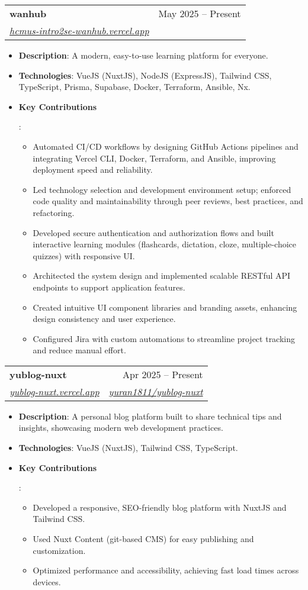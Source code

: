 \documentclass[letterpaper,11pt]{article}
\makeatletter
\newcommand{\resumeSubheading}[4]{\vspace{-1pt}\item
    \begin{tabular*}{0.97\textwidth}[t]{l@{\extracolsep{\fill}}r}
      \textbf{#1} & #2 \\
      \textit{\small#3} & \textit{\small #4} \\
    \end{tabular*}\vspace{-5pt}
}
\newcommand{\resumeItem}[2]{\item\small{\textbf{#1}{: #2\vspace{-2pt}}}}
\newcommand{\resumeItemListStart}{\begin{itemize}[leftmargin=*]}
\newcommand{\resumeItemListEnd}{\end{itemize}\vspace{-5pt}}
\makeatother
\begin{document}
\resumeSubheading
{wanhub}{May 2025 -- Present}
{\href{https://hcmus-intro2se-wanhub.vercel.app}{hcmus-intro2se-wanhub.vercel.app}}
{}
\resumeItemListStart
\resumeItem{Description}
{A modern, easy-to-use learning platform for everyone.}
\resumeItem{Technologies}
{VueJS (NuxtJS), NodeJS (ExpressJS), Tailwind CSS, TypeScript, Prisma, Supabase, Docker, Terraform, Ansible, Nx.}
\resumeItem{Key Contributions}
{\begin{itemize}[leftmargin=*]
	\item Automated CI/CD workflows by designing GitHub Actions pipelines and integrating Vercel CLI, Docker, Terraform, and Ansible, improving deployment speed and reliability.
	\item Led technology selection and development environment setup; enforced code quality and maintainability through peer reviews, best practices, and refactoring.
	\item Developed secure authentication and authorization flows and built interactive learning modules (flashcards, dictation, cloze, multiple-choice quizzes) with responsive UI.
	\item Architected the system design and implemented scalable RESTful API endpoints to support application features.
	\item Created intuitive UI component libraries and branding assets, enhancing design consistency and user experience.
	\item Configured Jira with custom automations to streamline project tracking and reduce manual effort.
\end{itemize}}
\resumeItemListEnd

\resumeSubheading
{yublog-nuxt}{Apr 2025 -- Present}
{\href{https://yublog-nuxt.vercel.app/}{yublog-nuxt.vercel.app}}
{\href{https://github.com/yuran1811/yublog-nuxt}{yuran1811/yublog-nuxt}}
\resumeItemListStart
\resumeItem{Description}
{A personal blog platform built to share technical tips and insights, showcasing modern web development practices.}
\resumeItem{Technologies}
{VueJS (NuxtJS), Tailwind CSS, TypeScript.}
\resumeItem{Key Contributions}
{\begin{itemize}[leftmargin=*]
	\item Developed a responsive, SEO-friendly blog platform with NuxtJS and Tailwind CSS\@.
	\item Used Nuxt Content (git-based CMS) for easy publishing and customization.
	\item Optimized performance and accessibility, achieving fast load times across devices.
\end{itemize}}
\resumeItemListEnd
\end{document}
